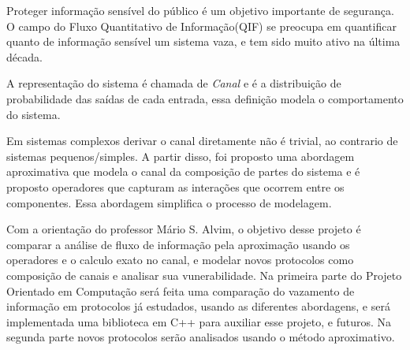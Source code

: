Proteger informação sensível do público é um objetivo importante de segurança. O campo do Fluxo Quantitativo de Informação(QIF) se preocupa em quantificar quanto de informação sensível um sistema vaza, e tem sido muito ativo na última década.

A representação do sistema é chamada de \emph{Canal} e é a distribuição de probabilidade das saídas de cada entrada, essa definição modela o comportamento do sistema.

Em sistemas complexos derivar o canal diretamente não é trivial, ao contrario de sistemas pequenos/simples.
A partir disso, foi proposto uma abordagem aproximativa que modela o canal da composição de partes do sistema e é proposto operadores que capturam as interações que ocorrem entre os componentes. %
Essa abordagem simplifica o processo de modelagem. %

Com a orientação do professor Mário S. Alvim, o objetivo desse projeto é comparar a análise de fluxo de informação pela aproximação usando os operadores e o calculo exato no canal, e modelar novos protocolos como composição de canais e analisar sua vunerabilidade.
Na primeira parte do Projeto Orientado em Computação será feita uma comparação do vazamento de informação em protocolos já estudados, usando as diferentes abordagens, e será implementada uma biblioteca em C++ para auxiliar esse projeto, e futuros. 
Na segunda parte novos protocolos serão analisados usando o método aproximativo.
